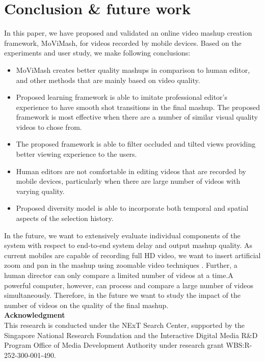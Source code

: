\documentclass{sig-alternate}
\begin{document}
\section{Conclusion & future work}
In this paper, we have proposed and validated an online video mashup creation framework, MoViMash, for videos recorded by mobile devices. Based on the experiments and user study, we make following conclusions:
\begin{itemize}
    \item MoViMash creates better quality mashups in comparison to human editor, and other methods that are mainly based on video quality.
    \item Proposed learning framework is able to imitate professional editor’s experience to have smooth shot transitions in the final mashup. The proposed framework is most effective when there are a number of similar visual quality videos to chose from.
    \item The proposed framework is able to filter occluded and tilted views providing better viewing experience to the users.
    \item Human editors are not comfortable in editing videos that are recorded by mobile devices, particularly when there are large number of videos with varying quality.
    \item Proposed diversity model is able to incorporate both temporal and spatial aspects of the selection history.
\end{itemize}

In the future, we want to extensively evaluate individual components of the system with respect to end-to-end system delay and output mashup quality. As current mobiles are capable of recording full HD video, we want to insert artificial zoom and pan in the mashup using zoomable video techniques \cite{11}. Further, a human director can only compare a limited number of videos at a time.A powerful computer, however, can process and compare a large number of videos simultaneously. Therefore, in the future we want to study the impact of the number of videos on the quality of the final mashup.\\
\textbf{Acknowledgment}\\
This research is conducted under the NExT Search Center, supported by the Singapore National Research Foundation and the Interactive Digital Media R&D Program Office of Media Development Authority under research grant WBS:R-252-300-001-490.
\cite{1} 
\cite{2}
\cite{3} 
\cite{4} 
\cite{5} 
\cite{6} 
\cite{7}
\cite{8}
\cite{9}
\cite{10}
\cite{11}
\cite{12}
\cite{13}
\cite{14}
\cite{15}
\cite{16}
\cite{17}
\cite{18}
\cite{19}
\cite{20}
\cite{21}


\end{document}
